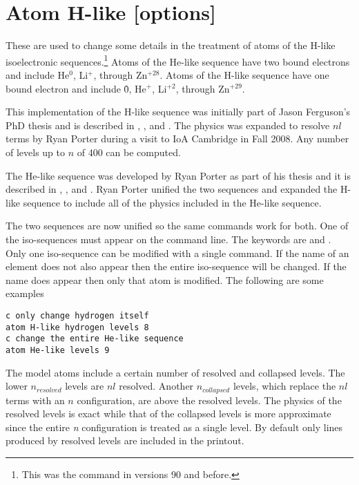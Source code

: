\section{Atom H-like [options]}

These are used to change some details in the treatment of atoms of the
H-like isoelectronic sequences.\footnote{This was the 
command in versions 90 and before.}
Atoms
of the He-like sequence have two bound electrons and include He$^0$,
Li$^+$, through Zn$^{+28}$.
Atoms of the H-like sequence
have one bound electron and include \h0, He$^{+}$, Li$^{+2}$,
through Zn$^{+29}$.

This implementation of the H-like sequence was initially part of Jason
Ferguson's PhD thesis and is described in \citet{FergusonFerland1997},
\citet{Ferguson2001}, and \citet{BottorffBaldwin2002}.
The physics was expanded
to resolve $nl$ terms by Ryan Porter during a visit to IoA
Cambridge in Fall 2008.
Any number of levels up to $n$ of 400 can be computed.

The He-like sequence was developed by Ryan Porter as part
of his thesis and it is described in \citet{Bauman2005},
\citet{Porter2005}, and \citet{PorterFerland2007}.
Ryan Porter unified the two sequences
and expanded the H-like sequence to include all of the physics included
in the He-like sequence.

The two sequences are now unified so the same
 commands work
for both.
One of the iso-sequences must appear on the command line.  The
keywords are  and .
Only one iso-sequence can be modified
with a single command.
If the name of an element does not also appear then
the entire iso-sequence will be changed.
If the name does appear then only
that atom is modified.  The following are some examples
\begin{verbatim}
c only change hydrogen itself
atom H-like hydrogen levels 8
c change the entire He-like sequence
atom He-like levels 9
\end{verbatim}
The model atoms include a certain number of resolved and collapsed levels.
The lower $n_{resolved}$ levels are $nl$ resolved.
Another $n_{collapsed}$ levels,
which replace the $nl$ terms with an $n$ configuration,
are above the resolved levels.
The physics of the resolved levels is exact while that of the
collapsed levels is more approximate since the entire \emph{n} configuration is
treated as a single level.
By default only lines produced by resolved levels
are included in the printout.


